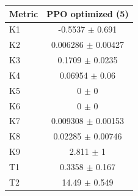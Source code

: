 \begin{tabular}{lc}
\toprule
Metric & PPO optimized (5) \\
\midrule
K1 & -0.5537 $\pm$ 0.691 \\
K2 & 0.006286 $\pm$ 0.00427 \\
K3 & 0.1709 $\pm$ 0.0235 \\
K4 & 0.06954 $\pm$ 0.06 \\
K5 & 0 $\pm$ 0 \\
K6 & 0 $\pm$ 0 \\
K7 & 0.009308 $\pm$ 0.00153 \\
K8 & 0.02285 $\pm$ 0.00746 \\
K9 & 2.811 $\pm$ 1 \\
T1 & 0.3358 $\pm$ 0.167 \\
T2 & 14.49 $\pm$ 0.549 \\
\bottomrule
\end{tabular}

